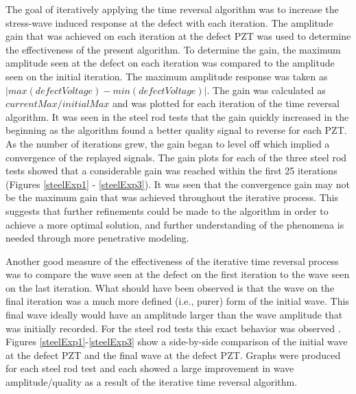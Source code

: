 \documentclass[11pt,letterpaper]{article}%
\begin{document}
The goal of iteratively applying the time reversal algorithm was to increase the stress-wave induced response at the defect with each iteration. The amplitude gain that was achieved on each iteration at the defect PZT was used to determine the effectiveness of the present algorithm. To determine the gain, the maximum amplitude seen at the defect on each iteration was compared to the amplitude seen on the initial iteration. The maximum amplitude response was taken as $|max(defectVoltage) - min(defectVoltage)|$. The gain was calculated as $currentMax / initialMax$ and was plotted for each iteration of the time reversal algorithm. It was seen in the steel rod tests that the gain quickly increased in the beginning as the algorithm found a better quality signal to reverse for each PZT. As the number of iterations grew, the gain began to level off which implied a convergence of the replayed signals. The gain plots for each of the three steel rod tests showed that a considerable gain was reached within the first 25 iterations (Figures \ref{steelExp1} - \ref{steelExp3}). It was seen that the convergence gain may not be the maximum gain that was achieved throughout the iterative process. This suggests that further refinements could be made to the algorithm in order to achieve a more optimal solution, and further understanding of the phenomena is needed through more penetrative modeling.

Another good measure of the effectiveness of the iterative time reversal process was to compare the wave seen at the defect on the first iteration to the wave seen on the last iteration. What should have been observed is that the wave on the final iteration was a much more defined (i.e., purer) form of the initial wave. This final wave ideally would have an amplitude larger than the wave amplitude that was initially recorded. For the steel rod tests this exact behavior was observed . Figures \ref{steelExp1}-\ref{steelExp3} show a side-by-side comparison of the initial wave at the defect PZT and the final wave at the defect PZT. Graphs were produced for each steel rod test and each showed a large improvement in wave amplitude/quality as a result of the iterative time reversal algorithm.
\end{document}
